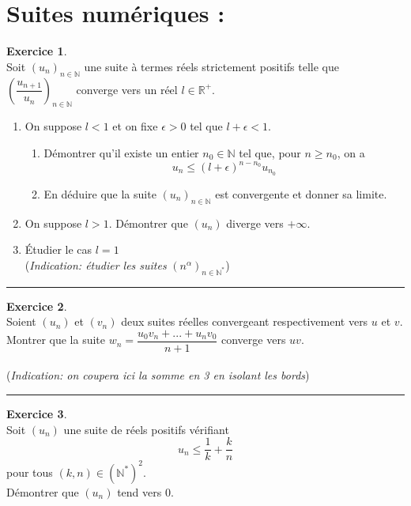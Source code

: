 \documentclass[a4paper,10pt]{article}
\theoremstyle{definition}
\theoremstyle{definition}
\newtheorem{exo}{Exercice}
\newcommand{\R}{\mathbb{R}}
\newcommand{\N}{\mathbb{N}}
\begin{document}
\section*{Suites numériques :}

\begin{minipage}{1\linewidth}
\begin{minipage}[t]{0.48\linewidth}
\raggedright
\begin{exo}\quad\\
Soit $(u_n)_{n\in\N}$ une suite à termes réels strictement positifs telle que $\left(\dfrac{u_{n+1}}{u_n}\right)_{n\in\N}$ converge vers un réel $l\in\R^+$.
\begin{enumerate}
\item On suppose $l<1$ et on fixe $\epsilon>0$ tel que $l+\epsilon<1$. 
\begin{enumerate}
\item Démontrer qu'il existe un entier $n_0\in\N$ tel que, pour $n\geq n_0$, on a 
$$u_n\leq\left(l+\epsilon\right)^{n-n_0}u_{n_0}$$
\item En déduire que la suite $(u_n)_{n\in\N}$ est convergente et donner sa limite. 


\end{enumerate}
\item  On suppose $l>1$. Démontrer que $(u_n)$ diverge vers $+\infty$.
\item Étudier le cas $l=1$\\
(\textit{Indication: étudier les suites } $(n^\alpha)_{n\in\N^*}$)
\end{enumerate} 
\centering
\rule{1\linewidth}{0.6pt}
\end{exo}

\begin{exo}\quad\\

Soient $(u_n)$ et $(v_n)$ deux suites réelles convergeant respectivement vers $u$ et $v$. Montrer que la suite $w_n=\dfrac{u_0v_n+...+u_nv_0}{n+1}$ converge vers $uv$.\\\hfill\\
(\textit{Indication: on coupera ici la somme en 3 en isolant les bords})

\centering\rule{1\linewidth}{0.6pt}
\end{exo}

\end{minipage}	
\hfill\vrule\hfill
\begin{minipage}[t]{0.48\linewidth}
\raggedright

\begin{exo}\quad\\
Soit $(u_n)$ une suite de réels positifs vérifiant $$u_n\leq \dfrac{1}{k}+\dfrac{k}{n}$$ pour tous $(k,n)\in(\N^*)^2$.\\ Démontrer que $(u_n)$ tend vers $0$.


\end{exo}
\end{minipage}
\end{minipage}
\end{document}
